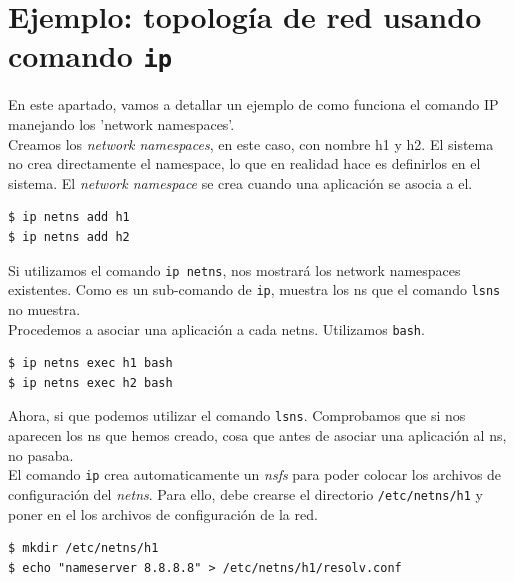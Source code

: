\documentclass[a4paper, oneside, 12pt]{book}
\begin{document}
	
	\pagebreak
	
	\section[Ejemplo: topología de red con \texttt{ip}]{Ejemplo: topología de red usando comando \texttt{ip}}
	\noindent En este apartado, vamos a detallar un ejemplo de como funciona el comando IP manejando los 'network namespaces'.\\
	
	\noindent Creamos los \textit{network namespaces}, en este caso, con nombre h1 y h2. El sistema no crea directamente el namespace, lo que en realidad hace es definirlos en el sistema. El \textit{network namespace} se crea cuando una aplicación se asocia a el.
	\begin{verbatim}
$ ip netns add h1
$ ip netns add h2
	\end{verbatim}

	\noindent Si utilizamos el comando \texttt{ip netns}, nos mostrará los network namespaces existentes. Como es un sub-comando de \texttt{ip}, muestra los ns que el comando \texttt{lsns} no muestra. \\
	
	\noindent Procedemos a asociar una aplicación a cada netns. Utilizamos \texttt{bash}.
	\begin{verbatim}
$ ip netns exec h1 bash
$ ip netns exec h2 bash
	\end{verbatim}

	\noindent Ahora, si que podemos utilizar el comando \texttt{lsns}. Comprobamos que si nos aparecen los ns que hemos creado, cosa que antes de asociar una aplicación al ns, no pasaba. \\
	
	\noindent El comando \texttt{ip} crea automaticamente un \textit{nsfs} para poder colocar los archivos de configuración del \textit{netns}. Para ello, debe crearse el directorio \texttt{/etc/netns/h1} y poner en el los archivos de configuración de la red.
	\begin{verbatim}
$ mkdir /etc/netns/h1
$ echo "nameserver 8.8.8.8" > /etc/netns/h1/resolv.conf
	\end{verbatim}
\end{document}

